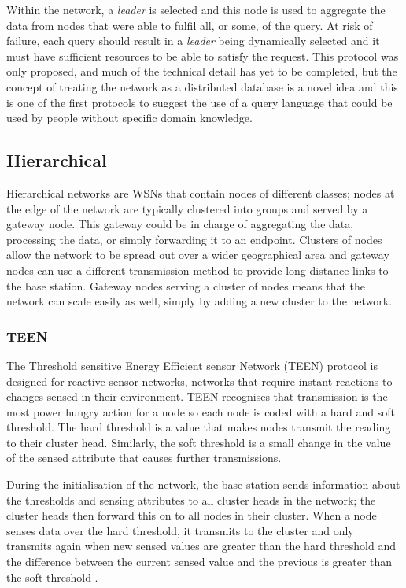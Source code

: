 Within the network, a \textit{leader} is selected and this node is used to aggregate the data from nodes that were able to fulfil all, or some, of the query. At risk of failure, each query should result in a \textit{leader} being dynamically selected and it must have sufficient resources to be able to satisfy the request. This protocol was only proposed, and much of the technical detail has yet to be completed, but the concept of treating the network as a distributed database is a novel idea and this is one of the first protocols to suggest the use of a query language that could be used by people without specific domain knowledge.

\subsection{Hierarchical}
	Hierarchical networks are WSNs that contain nodes of different classes; nodes at the edge of the network are typically clustered into groups and served by a gateway node. This gateway could be in charge of aggregating the data, processing the data, or simply forwarding it to an endpoint. Clusters of nodes allow the network to be spread out over a wider geographical area and gateway nodes can use a different transmission method to provide long distance links to the base station. Gateway nodes serving a cluster of nodes means that the network can scale easily as well, simply by adding a new cluster to the network.

\subsubsection{TEEN}
	The Threshold sensitive Energy Efficient sensor Network (TEEN) protocol is designed for reactive sensor networks, networks that require instant reactions to changes sensed in their environment. TEEN recognises that transmission is the most power hungry action for a node so each node is coded with a hard and soft threshold. The hard threshold is a value that makes nodes transmit the reading to their cluster head. Similarly, the soft threshold is a small change in the value of the sensed attribute that causes further transmissions.

During the initialisation of the network, the base station sends information about the thresholds and sensing attributes to all cluster heads in the network; the cluster heads then forward this on to all nodes in their cluster.  When a node senses data over the hard threshold, it transmits to the cluster and only transmits again when new sensed values are greater than the hard threshold and the difference between the current sensed value and the previous is greater than the soft threshold \cite{Manjeshwar2001}.

